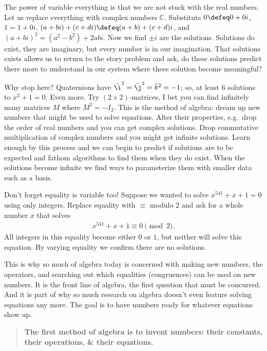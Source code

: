 The power of variable everything is that we are not stuck with the real numbers.
Let us replace everything with complex numbers $\mathbb{C}$. Substitute $0\defeq
0+0i$, $1=1+0i$, $(a+bi)+(c+di)\defeq (a+b)+(c+d)i$, and
$(a+bi)^2=(a^2-b^2)+2abi$.  Now we find $\pm i$ are the solutions. Solutions do
exist, they are imaginary, but every number is in our imagination. 
That solutions exists allows us to return to the story problem and ask,
do these solutions predict there more to understand in our system where 
these solution become meaningful?

Why stop here? Quaternions have $\hat{\i}^2=\hat{\j}^2=\hat{k}^2=-1$;
so, at least 6 solutions to $x^2+1=0$.  Even more.  Try $(2\times 2)$-matrices, I
bet you can find infinitely many matrices $M$ where $M^2=-I_2$.  This is the method
of algebra: dream up new numbers that might be used to solve equations.  Alter
their properties, e.g.\ drop the order of real numbers and you can get complex
solutions.  Drop commutative multiplication of complex numbers and you might get
infinite solutions.  Learn enough by this process and we can begin to predict if
solutions are to be expected and fathom algorithms to find them when they do
exist. When the solutions become infinite we find ways to parameterize them with
smaller data such as a basis.

Don't forget equality is variable too!  Suppose we wanted to solve $x^{541}+x+1=0$
using only integers.  Replace equality 
with $\equiv$ modulo 2 and ask for a whole number $x$ that solves
\begin{align*}
    x^{541}+x+1\equiv 0\pmod{2}.
\end{align*}
All integers in this equality become either $0$ or $1$, but neither will solve 
this equation.  By varying equality we confirm there are no solutions.

This is why so much of algebra today is concerned with making new numbers, the
operators, and searching out which equalities (congruences) can be used on new
numbers.  It is the front line of algebra, the first question that must be
concurred.  And it is  part of why so much research on algebra doesn't even
feature solving equations any more.  The goal is to have numbers ready for
whatever equations show up.

\begin{quote}
    \textbf{The first method of algebra is to invent numbers: their constants,
    their operations, \& their equations.}%
\end{quote}

